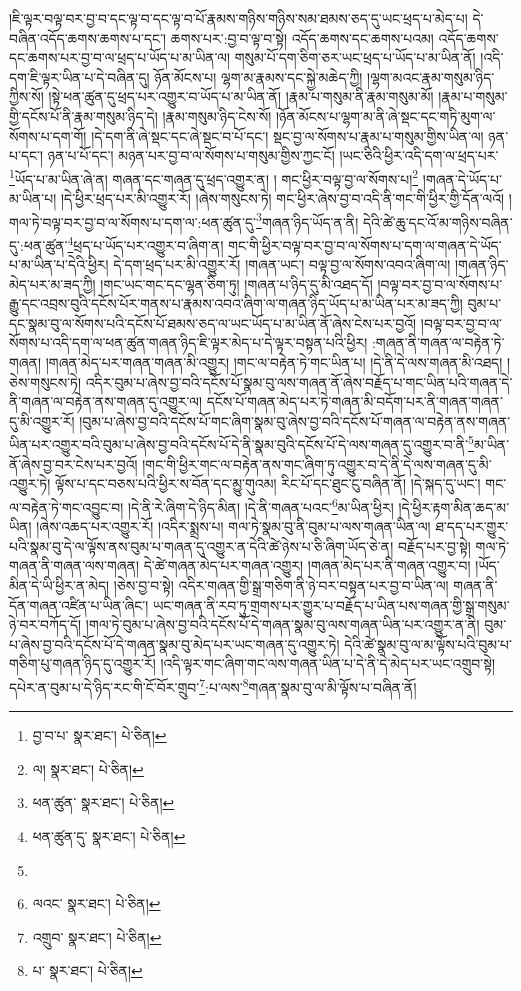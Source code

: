 །ཇི་ལྟར་བལྟ་བར་བྱ་བ་དང་ལྟ་བ་དང་ལྟ་བ་པོ་རྣམས་གཉིས་གཉིས་སམ་ཐམས་ཅད་དུ་ཡང་ཕྲད་པ་མེད་པ། དེ་བཞིན་འདོད་ཆགས་ཆགས་པ་དང་། ཆགས་པར་:བྱ་བ་ལྟ་བ་སྟེ། འདོད་ཆགས་དང་ཆགས་པའམ། འདོད་ཆགས་དང་ཆགས་པར་བྱ་བ་ལ་ཕྲད་པ་ཡོད་པ་མ་ཡིན་ལ། གསུམ་པོ་དག་ཅིག་ཅར་ཡང་ཕྲད་པ་ཡོད་པ་མ་ཡིན་ནོ། །འདི་དག་ཇི་ལྟར་ཡིན་པ་དེ་བཞིན་དུ། ཉོན་མོངས་པ། ལྷག་མ་རྣམས་དང་སྐྱེ་མཆེད་ཀྱི། །ལྷག་མའང་རྣམ་གསུམ་ཉིད་ཀྱིས་སོ། །སྟེ་ཕན་ཚུན་དུ་ཕྲད་པར་འགྱུར་བ་ཡོད་པ་མ་ཡིན་ནོ། །རྣམ་པ་གསུམ་ནི་རྣམ་གསུམ་མོ། །རྣམ་པ་གསུམ་གྱི་དངོས་པོ་ནི་རྣམ་གསུམ་ཉིད་དེ། །རྣམ་གསུམ་ཉིད་ངེས་སོ། །ཉོན་མོངས་པ་ལྷག་མ་ནི་ཞེ་སྡང་དང་གཏི་མུག་ལ་སོགས་པ་དག་གོ། །དེ་དག་ནི་ཞེ་སྡང་དང་ཞེ་སྡང་བ་པོ་དང་། སྡང་བྱ་ལ་སོགས་པ་རྣམ་པ་གསུམ་གྱིས་ཡིན་ལ། ཉན་པ་དང་། ཉན་པ་པོ་དང་། མཉན་པར་བྱ་བ་ལ་སོགས་པ་གསུམ་གྱིས་ཀྱང་ངོ། །ཡང་ཅིའི་ཕྱིར་འདི་དག་ལ་ཕྲད་པར་\footnote{བྱ་བ་པ་  སྣར་ཐང་།  པེ་ཅིན། }ཡོད་པ་མ་ཡིན་ཞེ་ན། གཞན་དང་གཞན་དུ་ཕྲད་འགྱུར་ན། །
གང་ཕྱིར་བལྟ་བྱ་ལ་སོགས་པ།\footnote{ལ།  སྣར་ཐང་།  པེ་ཅིན། } །གཞན་དེ་ཡོད་པ་མ་ཡིན་པ། །དེ་ཕྱིར་ཕྲད་པར་མི་འགྱུར་རོ། །ཞེས་གསུངས་ཏེ། གང་ཕྱིར་ཞེས་བྱ་བ་འདི་ནི་གང་གི་ཕྱིར་གྱི་དོན་ལའོ། །གལ་ཏེ་བལྟ་བར་བྱ་བ་ལ་སོགས་པ་དག་ལ་:ཕན་ཚུན་དུ་\footnote{ཕན་ཚུན་  སྣར་ཐང་།  པེ་ཅིན། }གཞན་ཉིད་ཡོད་ན་ནི། དེའི་ཚེ་ཆུ་དང་འོ་མ་གཉིས་བཞིན་དུ་:ཕན་ཚུན་\footnote{ཕན་ཚུན་དུ་  སྣར་ཐང་།  པེ་ཅིན། }ཕྲད་པ་ཡོད་པར་འགྱུར་བ་ཞིག་ན། གང་གི་ཕྱིར་བལྟ་བར་བྱ་བ་ལ་སོགས་པ་དག་ལ་གཞན་དེ་ཡོད་པ་མ་ཡིན་པ་དེའི་ཕྱིར། དེ་དག་ཕྲད་པར་མི་འགྱུར་རོ། །གཞན་ཡང་། བལྟ་བྱ་ལ་སོགས་འབའ་ཞིག་ལ། །གཞན་ཉིད་མེད་པར་མ་ཟད་ཀྱི། །གང་ཡང་གང་དང་ལྷན་ཅིག་ཏུ། །གཞན་པ་ཉིད་དུ་མི་འཐད་དོ། །བལྟ་བར་བྱ་བ་ལ་སོགས་པ་རྒྱུ་དང་འབྲས་བུའི་དངོས་པོར་གནས་པ་རྣམས་འབའ་ཞིག་ལ་གཞན་ཉིད་ཡོད་པ་མ་ཡིན་པར་མ་ཟད་ཀྱི། བུམ་པ་དང་སྣམ་བུ་ལ་སོགས་པའི་དངོས་པོ་ཐམས་ཅད་ལ་ཡང་ཡོད་པ་མ་ཡིན་ནོ་ཞེས་ངེས་པར་བྱའོ། །བལྟ་བར་བྱ་བ་ལ་སོགས་པ་འདི་དག་ལ་ཕན་ཚུན་གཞན་ཉིད་ཇི་ལྟར་མེད་པ་དེ་ལྟར་བསྟན་པའི་ཕྱིར། :གཞན་ནི་གཞན་ལ་བརྟེན་ཏེ་གཞན། །གཞན་མེད་པར་གཞན་གཞན་མི་འགྱུར། །གང་ལ་བརྟེན་ཏེ་གང་ཡིན་པ། །དེ་ནི་དེ་ལས་གཞན་མི་འཐད། །ཅེས་གསུངས་ཏེ། འདིར་བུམ་པ་ཞེས་བྱ་བའི་དངོས་པོ་སྣམ་བུ་ལས་གཞན་ནོ་ཞེས་བརྗོད་པ་གང་ཡིན་པའི་གཞན་དེ་ནི་གཞན་ལ་བརྟེན་ནས་གཞན་དུ་འགྱུར་ལ། དངོས་པོ་གཞན་མེད་པར་ཏེ་གཞན་མི་བདོག་པར་ནི་གཞན་གཞན་དུ་མི་འགྱུར་རོ། །བུམ་པ་ཞེས་བྱ་བའི་དངོས་པོ་གང་ཞིག་སྣམ་བུ་ཞེས་བྱ་བའི་དངོས་པོ་གཞན་ལ་བརྟེན་ནས་གཞན་ཡིན་པར་འགྱུར་བའི་བུམ་པ་ཞེས་བྱ་བའི་དངོས་པོ་དེ་ནི་སྣམ་བུའི་དངོས་པོ་དེ་ལས་གཞན་དུ་འགྱུར་བ་ནི་\footnote{}མ་ཡིན་ནོ་ཞེས་བྱ་བར་ངེས་པར་བྱའོ། །གང་གི་ཕྱིར་གང་ལ་བརྟེན་ནས་གང་ཞིག་ཏུ་འགྱུར་བ་དེ་ནི་དེ་ལས་གཞན་དུ་མི་འགྱུར་ཏེ། ལྟོས་པ་དང་བཅས་པའི་ཕྱིར་ས་བོན་དང་མྱུ་གུའམ། རིང་པོ་དང་ཐུང་ངུ་བཞིན་ནོ། །དེ་སྐད་དུ་ཡང་། གང་ལ་བརྟེན་ཏེ་གང་འབྱུང་བ། །དེ་ནི་རེ་ཞིག་དེ་ཉིད་མིན། །དེ་ནི་གཞན་པའང་\footnote{ལའང་  སྣར་ཐང་།  པེ་ཅིན། }མ་ཡིན་ཕྱིར། །དེ་ཕྱིར་རྟག་མིན་ཆད་མ་ཡིན། །ཞེས་འཆད་པར་འགྱུར་རོ། །འདིར་སྨྲས་པ། གལ་ཏེ་སྣམ་བུ་ནི་བུམ་པ་ལས་གཞན་ཡིན་ལ། ཐ་དད་པར་གྱུར་པའི་སྣམ་བུ་དེ་ལ་ལྟོས་ནས་བུམ་པ་གཞན་དུ་འགྱུར་ན་དེའི་ཚེ་ཉེས་པ་ཅི་ཞིག་ཡོད་ཅེ་ན། བརྗོད་པར་བྱ་སྟེ། གལ་ཏེ་གཞན་ནི་གཞན་ལས་གཞན། དེ་ཚེ་གཞན་མེད་པར་གཞན་འགྱུར། །གཞན་མེད་པར་ནི་གཞན་འགྱུར་བ། །ཡོད་མིན་དེ་ཡི་ཕྱིར་ན་མེད། །ཅེས་བྱ་བ་སྟེ། འདིར་གཞན་གྱི་སྒྲ་གཅིག་ནི་ཉེ་བར་བསྟན་པར་བྱ་བ་ཡིན་ལ། གཞན་ནི་དོན་གཞན་འཛིན་པ་ཡིན་ཞིང་། ཡང་གཞན་ནི་རབ་ཏུ་གྲགས་པར་གྱུར་པ་བརྗོད་པ་ཡིན་པས་གཞན་གྱི་སྒྲ་གསུམ་ཉེ་བར་བཀོད་དོ། །གལ་ཏེ་བུམ་པ་ཞེས་བྱ་བའི་དངོས་པོ་དེ་གཞན་སྣམ་བུ་ལས་གཞན་ཡིན་པར་འགྱུར་ན་ནི། བུམ་པ་ཞེས་བྱ་བའི་དངོས་པོ་དེ་གཞན་སྣམ་བུ་མེད་པར་ཡང་གཞན་དུ་འགྱུར་ཏེ། དེའི་ཚེ་སྣམ་བུ་ལ་མ་ལྟོས་པའི་བུམ་པ་གཅིག་པུ་གཞན་ཉིད་དུ་འགྱུར་རོ། །འདི་ལྟར་གང་ཞིག་གང་ལས་གཞན་ཡིན་པ་དེ་ནི་དེ་མེད་པར་ཡང་འགྲུབ་སྟེ། དཔེར་ན་བུམ་པ་དེ་ཉིད་རང་གི་ངོ་བོར་གྲུབ་\footnote{འགྲུབ་  སྣར་ཐང་།  པེ་ཅིན། }:པ་ལས་\footnote{པ་  སྣར་ཐང་།  པེ་ཅིན། }གཞན་སྣམ་བུ་ལ་མི་ལྟོས་པ་བཞིན་ནོ། 